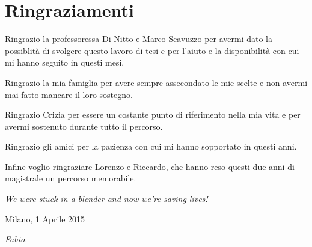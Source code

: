 \chapter*{Ringraziamenti}
Ringrazio la professoressa Di Nitto e Marco Scavuzzo per avermi dato la possiblit\`{a} di svolgere questo lavoro di tesi e per l'aiuto e la disponibilit\`{a} con cui mi hanno seguito in questi mesi.

\noindent Ringrazio la mia famiglia per avere sempre assecondato le mie scelte e non avermi mai fatto mancare il loro sostegno.
 
\noindent Ringrazio Crizia per essere un costante punto di riferimento nella mia vita e per avermi sostenuto durante tutto il percorso.

\noindent Ringrazio gli amici per la pazienza con cui mi hanno sopportato in questi anni.

\noindent Infine voglio ringraziare Lorenzo e Riccardo, che hanno reso questi due anni di magistrale un percorso memorabile.
 
\noindent \textit{We were stuck in a blender and now we're saving lives!}

\begin{flushleft}
Milano, 1 Aprile 2015
\end{flushleft}

\begin{flushright}
\emph{Fabio.}
\end{flushright}

\cleardoublepage